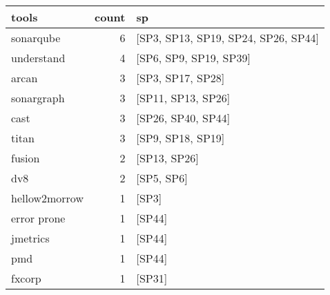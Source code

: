 \begin{tabular}{lrl}
\toprule
               tools &  count &                                                                                                           sp \\
\midrule
           sonarqube &      6 &                                                                          [SP3, SP13, SP19, SP24, SP26, SP44] \\
          understand &      4 &                                                                                       [SP6, SP9, SP19, SP39] \\
               arcan &      3 &                                                                                            [SP3, SP17, SP28] \\
          sonargraph &      3 &                                                                                           [SP11, SP13, SP26] \\
                cast &      3 &                                                                                           [SP26, SP40, SP44] \\
               titan &      3 &                                                                                            [SP9, SP18, SP19] \\
              fusion &      2 &                                                                                                 [SP13, SP26] \\
                 dv8 &      2 &                                                                                                   [SP5, SP6] \\
       hellow2morrow &      1 &                                                                                                        [SP3] \\
         error prone &      1 &                                                                                                       [SP44] \\
            jmetrics &      1 &                                                                                                       [SP44] \\
                 pmd &      1 &                                                                                                       [SP44] \\
              fxcorp &      1 &                                                                                                       [SP31] \\

\end{tabular}
